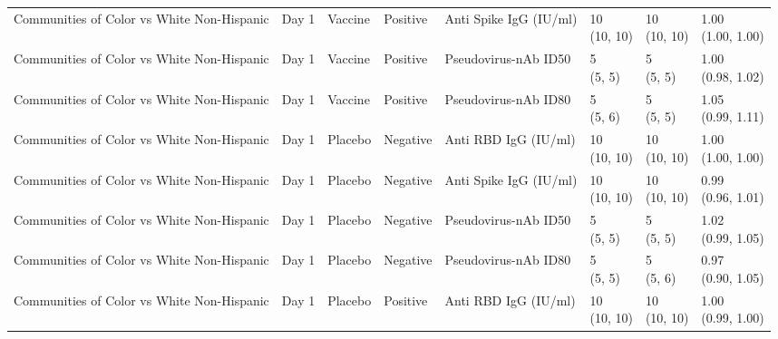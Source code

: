 \documentclass[]{book}
\theoremstyle{definition}
\theoremstyle{definition}
\theoremstyle{definition}
\newcommand{\1}{\mathbbm{1}}
\begin{document}
\begin{landscape}
\begin{ThreePartTable}
\begin{longtable}[t]{>{\raggedright\arraybackslash}p{2.7cm}lllllll}
Communities of Color vs White Non-Hispanic & Day 1 & Vaccine & Positive & Anti Spike IgG (IU/ml) & \makecell[l]{10\\(10, 10)} & \makecell[l]{10\\(10, 10)} & \makecell[l]{1.00\\(1.00, 1.00)}\\
Communities of Color vs White Non-Hispanic & Day 1 & Vaccine & Positive & Pseudovirus-nAb ID50 & \makecell[l]{5\\(5, 5)} & \makecell[l]{5\\(5, 5)} & \makecell[l]{1.00\\(0.98, 1.02)}\\
\addlinespace
Communities of Color vs White Non-Hispanic & Day 1 & Vaccine & Positive & Pseudovirus-nAb ID80 & \makecell[l]{5\\(5, 6)} & \makecell[l]{5\\(5, 5)} & \makecell[l]{1.05\\(0.99, 1.11)}\\
Communities of Color vs White Non-Hispanic & Day 1 & Placebo & Negative & Anti RBD IgG (IU/ml) & \makecell[l]{10\\(10, 10)} & \makecell[l]{10\\(10, 10)} & \makecell[l]{1.00\\(1.00, 1.00)}\\
Communities of Color vs White Non-Hispanic & Day 1 & Placebo & Negative & Anti Spike IgG (IU/ml) & \makecell[l]{10\\(10, 10)} & \makecell[l]{10\\(10, 10)} & \makecell[l]{0.99\\(0.96, 1.01)}\\
Communities of Color vs White Non-Hispanic & Day 1 & Placebo & Negative & Pseudovirus-nAb ID50 & \makecell[l]{5\\(5, 5)} & \makecell[l]{5\\(5, 5)} & \makecell[l]{1.02\\(0.99, 1.05)}\\
Communities of Color vs White Non-Hispanic & Day 1 & Placebo & Negative & Pseudovirus-nAb ID80 & \makecell[l]{5\\(5, 5)} & \makecell[l]{5\\(5, 6)} & \makecell[l]{0.97\\(0.90, 1.05)}\\
\addlinespace
Communities of Color vs White Non-Hispanic & Day 1 & Placebo & Positive & Anti RBD IgG (IU/ml) & \makecell[l]{10\\(10, 10)} & \makecell[l]{10\\(10, 10)} & \makecell[l]{1.00\\(0.99, 1.00)}\\

\end{longtable}
\end{ThreePartTable}
\end{landscape}
\end{document}
